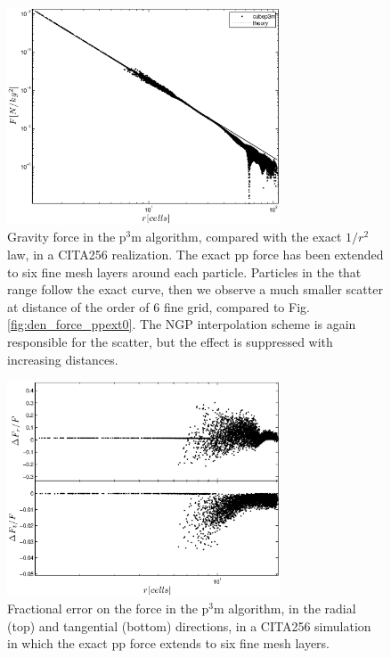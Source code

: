  \begin{figure}%
  \begin{center}
    \includegraphics[width=3.2in]{graphs/densityForce_ppext=6.eps}
  \caption{Gravity force in the p$^3$m algorithm, compared with the exact $1/r^{2}$ law,
  in a CITA256 realization. The exact pp force has been extended to six fine mesh layers around each particle.
  Particles in the that range follow the exact curve, then we observe a much smaller scatter at 
  distance of the order of 6 fine grid, compared to Fig. \ref{fig:den_force_ppext0}. 
  The NGP interpolation scheme is again responsible for the scatter, but the effect is suppressed with increasing distances. 
    \label{fig:den_force_ppext6}}
\end{center}
\end{figure}


 
\begin{figure}%
  \begin{center}
    \includegraphics[width=3.2in]{graphs/densityForce_fracErr_ppext=6.eps}
  \caption{Fractional error on the force in the p$^3$m algorithm, in the radial (top) and tangential (bottom) directions,
  in a CITA256 simulation in which the exact pp force extends to six fine mesh layers.
    \label{fig:den_force_fracErr_ppext6}}
\end{center}
\end{figure}

